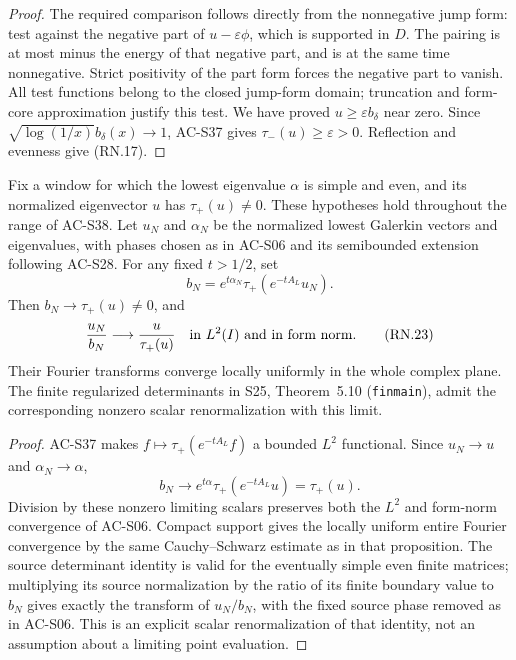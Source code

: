 \begin{proof}
The required comparison follows directly from the nonnegative jump
form: test against the negative part of
\(u-\varepsilon\phi\), which is supported in \(D\).
The pairing is at most minus the energy of that negative part,
and is at the same time nonnegative.
Strict positivity of the part form forces the negative part to vanish.
All test functions belong to the closed jump-form domain;
truncation and form-core approximation justify this test.
We have proved \(u\geq\varepsilon b_\delta\) near zero.
Since \(\sqrt{\log(1/x)}b_\delta(x)\to1\), AC-S37 gives
\(\tau_-(u)\geq\varepsilon>0\).
Reflection and evenness give (RN.17).
\end{proof}

\begin{corollary}
\label{AC-S39}
Fix a window for which the lowest eigenvalue \(\alpha\) is simple
and even, and its normalized eigenvector \(u\) has \(\tau_+(u)\ne0\).
These hypotheses hold throughout the range of AC-S38.
Let \(u_N\) and \(\alpha_N\) be the normalized lowest Galerkin
vectors and eigenvalues, with phases chosen as in AC-S06 and its
semibounded extension following AC-S28.
For any fixed \(t>1/2\), set
\[
 b_N=e^{t\alpha_N}\tau_+(e^{-tA_L}u_N).
                                                        \tag{RN.22}
\]
Then \(b_N\to\tau_+(u)\ne0\), and
\[
 \frac{u_N}{b_N}\longrightarrow\frac{u}{\tau_+(u)}
 \quad\hbox{in }L^2(I)\hbox{ and in form norm}.
                                                        \tag{RN.23}
\]
Their Fourier transforms converge locally uniformly in the whole
complex plane.  The finite regularized determinants in S25,
Theorem~5.10 (\texttt{finmain}), admit the corresponding nonzero
scalar renormalization with this limit.
\end{corollary}
\begin{proof}
AC-S37 makes \(f\mapsto\tau_+(e^{-tA_L}f)\) a bounded
\(L^2\) functional.  Since \(u_N\to u\) and
\(\alpha_N\to\alpha\),
\[
 b_N\longrightarrow e^{t\alpha}\tau_+(e^{-tA_L}u)
                  =\tau_+(u).
\]
Division by these nonzero limiting scalars preserves both the
\(L^2\) and form-norm convergence of AC-S06.
Compact support gives the locally uniform entire Fourier convergence
by the same Cauchy--Schwarz estimate as in that proposition.
The source determinant identity is valid for the eventually
simple even finite matrices; multiplying its source normalization
by the ratio of its finite boundary value to \(b_N\) gives exactly
the transform of \(u_N/b_N\), with the fixed source phase removed
as in AC-S06.  This is an explicit scalar renormalization of that
identity, not an assumption about a limiting point evaluation.
\end{proof}

